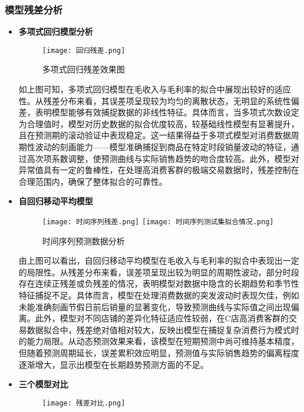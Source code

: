 \documentclass[withoutpreface,bwprint]{cumcmthesis}
\begin{document}
\subsubsection{模型残差分析}
\par
\begin{itemize}
    \item \textbf{多项式回归模型分析}
    \begin{figure}[H]
    \centering
    \texttt{[image: 回归残差.png]}
    \caption{多项式回归残差效果图}
    \end{figure}
    如上图可知，多项式回归模型在毛收入与毛利率的拟合中展现出较好的适应性。从残差分布来看，其误差项呈现较为均匀的离散状态，无明显的系统性偏差，表明模型能够有效捕捉数据的非线性特征。具体而言，当多项式次数设定为合理值时，模型对历史数据的拟合优度较高，较基础线性模型有显著提升，且在预测期的滚动验证中表现稳定。这一结果得益于多项式模型对消费数据周期性波动的刻画能力——模型准确捕捉到商品在特定时段销量波动的特征，通过高次项系数调整，使预测曲线与实际销售趋势的吻合度较高。此外，模型对异常值具有一定的鲁棒性，在处理高消费客群的极端交易数据时，残差控制在合理范围内，确保了整体拟合的可靠性。
\par
    \item \textbf{自回归移动平均模型}
    \begin{figure}[H]
    \centering
    {\texttt{[image: 时间序列残差.png]}}
    {\texttt{[image: 时间序列测试集拟合情况.png]}}
    \caption{时间序列预测数据分析}\label{fig:双图}
    \end{figure} 
    由上图可以看出，自回归移动平均模型在毛收入与毛利率的拟合中表现出一定的局限性。从残差分布来看，误差项呈现出较为明显的周期性波动，部分时段存在连续正残差或负残差的情况，表明模型对数据中隐含的长期趋势和季节性特征捕捉不足。具体而言，模型在处理消费数据的突发波动时表现欠佳，例如未能准确刻画节假日前后销量的显著变化，导致预测曲线与实际值之间出现偏离。此外，模型对不同店铺的差异化特征适应性较弱，在C店高消费客群的交易数据拟合中，残差绝对值相对较大，反映出模型在捕捉复杂消费行为模式时的能力局限。从动态预测效果来看，该模型在短期预测中尚可维持基本精度，但随着预测周期延长，误差累积效应明显，预测值与实际销售趋势的偏离程度逐渐增大，显示出模型在长期趋势预测方面的不足。
\par
    \item \textbf{三个模型对比}
    \begin{figure}[H]
    \centering
    \texttt{[image: 残差对比.png]}

\end{figure}
\end{itemize}
\end{document}
